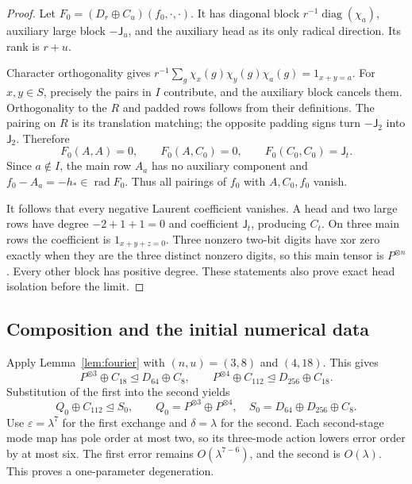 \documentclass[11pt]{article}
\theoremstyle{definition}\newtheorem{definition}[theorem]{Definition}
\theoremstyle{remark}\newtheorem{remark}[theorem]{Remark}
\newcommand{\rad}{\operatorname{rad}}
\newcommand{\diag}{\operatorname{diag}}
\newcommand{\J}{\mathsf J}
\begin{document}
\begin{proof}
Let $F_0=(D_r\oplus C_u)(f_0,\cdot,\cdot)$. It has diagonal block $r^{-1}\diag(\chi_a)$, auxiliary large block $-\J_u$, and the auxiliary head as its only radical direction. Its rank is $r+u$.

Character orthogonality gives $r^{-1}\sum_g\chi_x(g)\chi_y(g)\chi_a(g)=1_{x+y=a}$. For $x,y\in S$, precisely the pairs in $I$ contribute, and the auxiliary block cancels them. Orthogonality to the $R$ and padded rows follows from their definitions. The pairing on $R$ is its translation matching; the opposite padding signs turn $-\J_2$ into $\J_2$. Therefore
\begin{equation}\label{eq:fourier-grams}
 F_0(A,A)=0,\qquad F_0(A,C_0)=0,\qquad F_0(C_0,C_0)=\J_t.
\end{equation}
Since $a\notin I$, the main row $A_a$ has no auxiliary component and $f_0-A_a=-h_*\in\rad F_0$. Thus all pairings of $f_0$ with $A,C_0,f_0$ vanish.

It follows that every negative Laurent coefficient vanishes. A head and two large rows have degree $-2+1+1=0$ and coefficient $\J_t$, producing $C_t$. On three main rows the coefficient is $1_{x+y+z=0}$. Three nonzero two-bit digits have xor zero exactly when they are the three distinct nonzero digits, so this main tensor is $P^{\otimes n}$. Every other block has positive degree. These statements also prove exact head isolation before the limit.
\end{proof}

\subsection{Composition and the initial numerical data}

Apply Lemma~\ref{lem:fourier} with $(n,u)=(3,8)$ and $(4,18)$. This gives
\[
 P^{\otimes3}\oplus C_{18}\unlhd D_{64}\oplus C_8,
 \qquad
 P^{\otimes4}\oplus C_{112}\unlhd D_{256}\oplus C_{18}.
\]
Substitution of the first into the second yields
\begin{equation}\label{eq:initial-degeneration}
 Q_0\oplus C_{112}\unlhd S_0,
 \qquad
 Q_0=P^{\otimes3}\oplus P^{\otimes4},\quad
 S_0=D_{64}\oplus D_{256}\oplus C_8.
\end{equation}
Use $\varepsilon=\lambda^7$ for the first exchange and $\delta=\lambda$ for the second. Each second-stage mode map has pole order at most two, so its three-mode action lowers error order by at most six. The first error remains $O(\lambda^{7-6})$, and the second is $O(\lambda)$. This proves a one-parameter degeneration.
\end{document}
